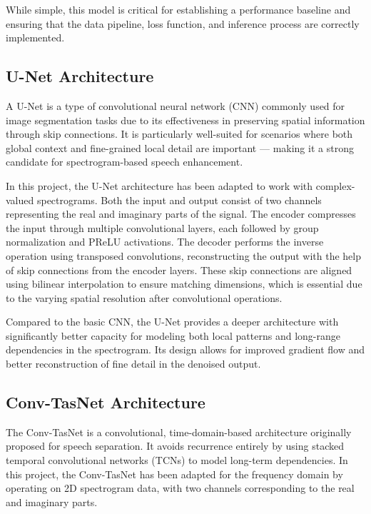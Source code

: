 While simple, this model is critical for establishing a performance baseline and ensuring that the data pipeline, loss function, and inference process are correctly implemented.

\subsection{U-Net Architecture}

A U-Net is a type of convolutional neural network (CNN) commonly used for image segmentation tasks due to its effectiveness in preserving spatial information through skip connections. It is particularly well-suited for scenarios where both global context and fine-grained local detail are important — making it a strong candidate for spectrogram-based speech enhancement.

In this project, the U-Net architecture has been adapted to work with complex-valued spectrograms. Both the input and output consist of two channels representing the real and imaginary parts of the signal. The encoder compresses the input through multiple convolutional layers, each followed by group normalization and PReLU activations. The decoder performs the inverse operation using transposed convolutions, reconstructing the output with the help of skip connections from the encoder layers. These skip connections are aligned using bilinear interpolation to ensure matching dimensions, which is essential due to the varying spatial resolution after convolutional operations.

Compared to the basic CNN, the U-Net provides a deeper architecture with significantly better capacity for modeling both local patterns and long-range dependencies in the spectrogram. Its design allows for improved gradient flow and better reconstruction of fine detail in the denoised output.

\subsection{Conv-TasNet Architecture}

The Conv-TasNet is a convolutional, time-domain-based architecture originally proposed for speech separation. It avoids recurrence entirely by using stacked temporal convolutional networks (TCNs) to model long-term dependencies. In this project, the Conv-TasNet has been adapted for the frequency domain by operating on 2D spectrogram data, with two channels corresponding to the real and imaginary parts.

